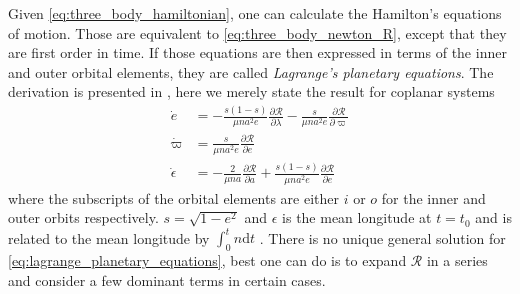 \documentclass[twoside,openright,titlepage,numbers=noenddot,headinclude,%
                footinclude=true,cleardoublepage=empty,abstractoff, 
                BCOR=5mm,paper=a4,fontsize=11pt,%
                american,%
                ]{scrreprt}%
\begin{document}
Given 
\cref{eq:three_body_hamiltonian}, one can calculate the Hamilton's equations of
motion. Those are equivalent to \cref{eq:three_body_newton_R}, except that they
are first order in time. If those equations are then expressed in terms
of the inner and outer orbital elements, they are called 
\emph{Lagrange's planetary equations}. The derivation is presented
in \citet[for ex.][]{brouwer1961}, here we merely state the result for coplanar
systems
\begin{equation}
\begin{aligned}
    \dot{e}&= -\frac{s(1-s)}{\mu na^2e} 
    \frac{\partial\mathcal{R}}{\partial\lambda}
    -\frac{s}{\mu na^2e} 
    \frac{\partial\mathcal{R}}{\partial\varpi}\\
    \dot{\varpi}&= \frac{s}{\mu na^2e} 
    \frac{\partial\mathcal{R}}{\partial e}\\
    \dot{\epsilon}&=- \frac{2}{\mu n a} 
    \frac{\partial\mathcal{R}}{\partial a}
   +\frac{s(1-s)}{\mu na^2e} 
    \frac{\partial\mathcal{R}}{\partial e} 
\end{aligned}
    \label{eq:lagrange_planetary_equations}
\end{equation}
where the subscripts of the orbital elements are either $i$
or $o$ for the inner and outer orbits respectively. $s=\sqrt{1-e^2}$
and $\epsilon$ is the mean longitude at $t=t_0$ and is related
to the mean longitude by $\int^t_0 n\mathrm{d}t$ 
\citep[see.][for details]{Mardling2013}. There is no unique general 
solution for \cref{eq:lagrange_planetary_equations}, best one can do
is to expand $\mathcal{R}$ in a series and consider a few dominant
terms in certain cases.
\end{document}
